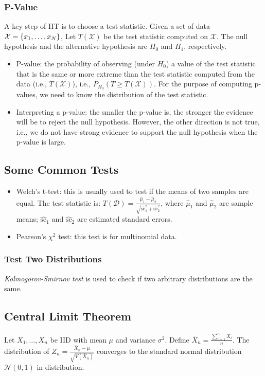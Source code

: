     \subsubsection{P-Value}
    A key step of HT is to choose a test statistic.
    Given a set of data $\mathcal{X} = \{ x_1, \ldots, x_N \}$, 
    Let $T(\mathcal{X})$ be the test statistic computed on $\mathcal{X}$.
    The null hypothesis and the alternative hypothesis are $H_0$ and $H_1$, respectively.
    \begin{itemize}
        \item P-value: the probability of observing (under $H_0$) a value of the test statistic that is the same or more extreme than the test statistic computed from the data (i.e., $T(\mathcal{X})$), i.e., $P_{H_0}(T \ge T(\mathcal{X}))$. 
        For the purpose of computing p-values, we need to know the distribution of the test statistic.
        \item Interpreting a p-value: the smaller the p-value is, the stronger the evidence will be to reject the null hypothesis. However, the other direction is not true, i.e., we do not have strong evidence to support the null hypothesis when the p-value is large.
    \end{itemize}
    
    \subsection{Some Common Tests}
        \begin{itemize}
            \item Welch's t-test: this is usually used to test if the means of two samples are equal.
            The test statistic is: $T(\mathcal{D}) = \frac{\hat{\mu}_1 - \hat{\mu}_2}{\sqrt{ \hat{\text{se}}_1^2 +  \hat{\text{se}}_2^2  }}$, where $\hat{\mu}_1$ and $\hat{\mu}_2$ are sample means; $\hat{\text{se}}_1$ and $\hat{\text{se}}_2$ are estimated standard errors.
            \item Pearson's $\chi^2$ test: this test is for multinomial data.
        \end{itemize}
    
    \subsubsection{Test Two Distributions}
     \emph{Kolmogorov-Smirnov test} is used to check if two arbitrary distributions are the same.
     
    
    \subsection{Central Limit Theorem}
        Let $X_1, \ldots, X_n$ be IID with mean $\mu$ and variance $\sigma^2$. 
        Define $\bar{X}_n = \frac{\sum_{i=1}^{n}{X_i}}{n}$.
        The distribution of $Z_n=\frac{\bar{X}_n - \mu}{\sqrt{V(\bar{X}_n)}}$ converges to the standard normal distribution $\mathcal{N}(0, 1)$ in distribution.
    
